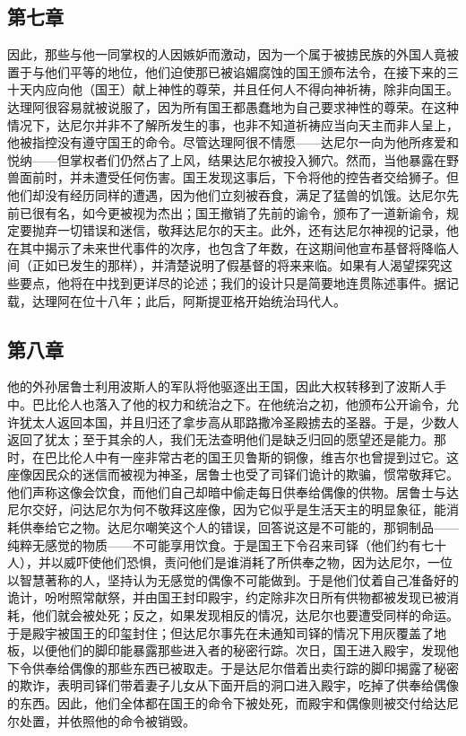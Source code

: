 
\subsection{第七章}

因此，那些与他一同掌权的人因嫉妒而激动，因为一个属于被掳民族的外国人竟被置于与他们平等的地位，他们迫使那已被谄媚腐蚀的国王颁布法令，在接下来的三十天内应向他（国王）献上神性的尊荣，并且任何人不得向神祈祷，除非向国王。达理阿很容易就被说服了，因为所有国王都愚蠢地为自己要求神性的尊荣。在这种情况下，达尼尔并非不了解所发生的事，也非不知道祈祷应当向天主而非人呈上，他被指控没有遵守国王的命令。尽管达理阿很不情愿——达尼尔一向为他所疼爱和悦纳——但掌权者们仍然占了上风，结果达尼尔被投入狮穴。然而，当他暴露在野兽面前时，并未遭受任何伤害。国王发现这事后，下令将他的控告者交给狮子。但他们却没有经历同样的遭遇，因为他们立刻被吞食，满足了猛兽的饥饿。达尼尔先前已很有名，如今更被视为杰出；国王撤销了先前的谕令，颁布了一道新谕令，规定要抛弃一切错误和迷信，敬拜达尼尔的天主。此外，还有达尼尔神视的记录，他在其中揭示了未来世代事件的次序，也包含了年数，在这期间他宣布基督将降临人间（正如已发生的那样），并清楚说明了假基督的将来来临。如果有人渴望探究这些要点，他将在中找到更详尽的论述；我们的设计只是简要地连贯陈述事件。据记载，达理阿在位十八年；此后，阿斯提亚格开始统治玛代人。\par


\subsection{第八章}

他的外孙居鲁士利用波斯人的军队将他驱逐出王国，因此大权转移到了波斯人手中。巴比伦人也落入了他的权力和统治之下。在他统治之初，他颁布公开谕令，允许犹太人返回本国，并且归还了拿步高从耶路撒冷圣殿掳去的圣器。于是，少数人返回了犹太；至于其余的人，我们无法查明他们是缺乏归回的愿望还是能力。那时，在巴比伦人中有一座非常古老的国王贝鲁斯的铜像，维吉尔也曾提到过它。这座像因民众的迷信而被视为神圣，居鲁士也受了司铎们诡计的欺骗，惯常敬拜它。他们声称这像会饮食，而他们自己却暗中偷走每日供奉给偶像的供物。居鲁士与达尼尔交好，问达尼尔为何不敬拜这座像，因为它似乎是生活天主的明显象征，能消耗供奉给它之物。达尼尔嘲笑这个人的错误，回答说这是不可能的，那铜制品——纯粹无感觉的物质——不可能享用饮食。于是国王下令召来司铎（他们约有七十人），并以威吓使他们恐惧，责问他们是谁消耗了所供奉之物，因为达尼尔，一位以智慧著称的人，坚持认为无感觉的偶像不可能做到。于是他们仗着自己准备好的诡计，吩咐照常献祭，并由国王封印殿宇，约定除非次日所有供物都被发现已被消耗，他们就会被处死；反之，如果发现相反的情况，达尼尔也要遭受同样的命运。于是殿宇被国王的印玺封住；但达尼尔事先在未通知司铎的情况下用灰覆盖了地板，以便他们的脚印能暴露那些进入者的秘密行踪。次日，国王进入殿宇，发现他下令供奉给偶像的那些东西已被取走。于是达尼尔借着出卖行踪的脚印揭露了秘密的欺诈，表明司铎们带着妻子儿女从下面开启的洞口进入殿宇，吃掉了供奉给偶像的东西。因此，他们全体都在国王的命令下被处死，而殿宇和偶像则被交付给达尼尔处置，并依照他的命令被销毁。\par

